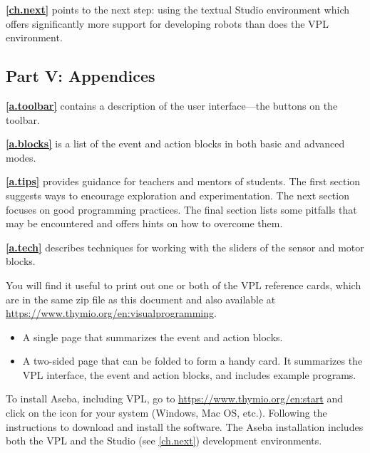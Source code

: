 \textbf{\cref{ch.next}} points to the next step: using the
textual Studio environment which offers significantly more support for
developing robots than does the VPL environment.

\bigskip

\subsection*{Part V: Appendices}

\textbf{\cref{a.toolbar}} contains a description of the user
interface---the buttons on the toolbar.

\textbf{\cref{a.blocks}} is a list of the event and
action blocks in both basic and advanced modes.

\textbf{\cref{a.tips}} provides guidance for teachers and
mentors of students. The first section suggests ways to encourage
exploration and experimentation. The next section focuses on good
programming practices. The final section lists some pitfalls that may be
encountered and offers hints on how to overcome them.

\textbf{\cref{a.tech}} describes techniques for working with the
sliders of the sensor and motor blocks.

 \quad {}



You will find it useful to print out one or both of the VPL reference cards,
which are in the same zip file as this document and also available
at \href{https://www.thymio.org/en:visualprogramming}{https://www.thymio.org/en:visualprogramming}.

\begin{itemize}
\item A single page that summarizes the event and action blocks.
\item A two-sided page that can be folded to form a handy card.
It summarizes the VPL interface, the event and action blocks,
and includes example programs.
\end{itemize}


To install Aseba, including VPL, go to
\href{https://www.thymio.org/en:start}{https://www.thymio.org/en:start}
and click on the icon for your system (Windows, Mac OS, etc.). Following
the instructions to download and install the software. The Aseba
installation includes both the VPL and the Studio (see \cref{ch.next})
development environments.
